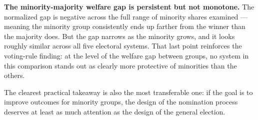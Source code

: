 \documentclass[11pt]{article}
\begin{document}
\textbf{The minority-majority welfare gap is persistent but not
monotone.} The normalized gap is negative across the full range of
minority shares examined --- meaning the minority group consistently
ends up farther from the winner than the majority does. But the gap
narrows as the minority grows, and it looks roughly similar across all
five electoral systems. That last point reinforces the voting-rule
finding: at the level of the welfare gap between groups, no system in
this comparison stands out as clearly more protective of minorities than
the others.

The clearest practical takeaway is also the most transferable one: if
the goal is to improve outcomes for minority groups, the design of the
nomination process deserves at least as much attention as the design of
the general election.

    


    
    
    
\end{document}
